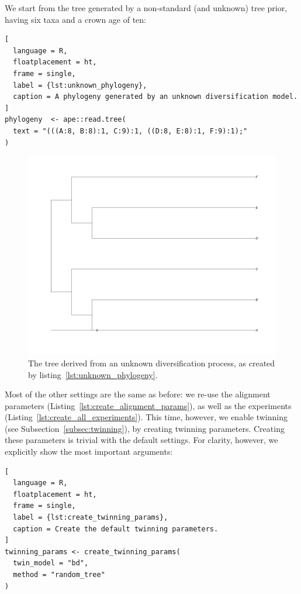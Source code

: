 We start from the tree generated by a non-standard (and unknown) tree prior, having six taxa and a crown age of ten:
\begin{lstlisting}[
  language = R, 
  floatplacement = ht,
  frame = single, 
  label = {lst:unknown_phylogeny},
  caption = A phylogeny generated by an unknown diversification model.
]
phylogeny  <- ape::read.tree(
  text = "(((A:8, B:8):1, C:9):1, ((D:8, E:8):1, F:9):1);"
)
\end{lstlisting}
\begin{figure}[H]
  \includegraphics[width=\textwidth]{example_6/true_tree.png}
  \caption{The tree derived from an unknown diversification process, 
    as created by listing~\ref{lst:unknown_phylogeny}.
  }
\end{figure}

Most of the other settings are the same as before: we re-use the alignment parameters (Listing~\ref{lst:create_alignment_params}), as well as the experiments (Listing~\ref{lst:create_all_experiments}).
This time, however, we enable twinning (see Subsection~\ref{subsec:twinning}),
by creating twinning parameters.
Creating these parameters is trivial with the default settings.
For clarity, however, we explicitly show the most important arguments:

\begin{lstlisting}[
  language = R,
  floatplacement = ht,
  frame = single,
  label = {lst:create_twinning_params},
  caption = Create the default twinning parameters.
]
twinning_params <- create_twinning_params(
  twin_model = "bd", 
  method = "random_tree"
)
\end{lstlisting}

